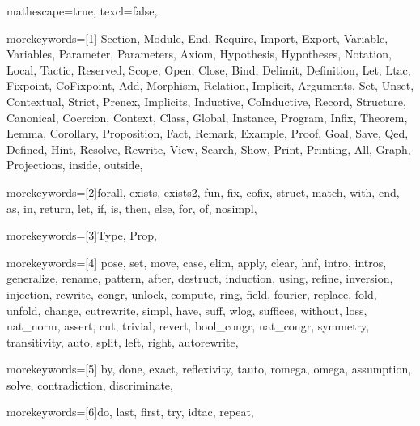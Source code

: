 
 {

mathescape=true,						
texcl=false,


morekeywords=[1]{
Section, Module, End, Require, Import, Export,
Variable, Variables, Parameter, Parameters, Axiom, Hypothesis, Hypotheses,
Notation, Local, Tactic, Reserved, Scope, Open, Close, Bind, Delimit,
Definition, Let, Ltac, Fixpoint, CoFixpoint, Add, Morphism, Relation,
Implicit, Arguments, Set, Unset, Contextual, Strict, Prenex, Implicits,
Inductive, CoInductive, Record, Structure, Canonical, Coercion,
Context, Class, Global, Instance, Program, Infix,
Theorem, Lemma, Corollary, Proposition, Fact, Remark, Example,
Proof, Goal, Save, Qed, Defined, Hint, Resolve, Rewrite, View,
Search, Show, Print, Printing, All, Graph, Projections, inside, outside},

morekeywords=[2]{forall, exists, exists2, fun, fix, cofix, struct,
      match, with, end, as, in, return, let, if, is, then, else,
      for, of, nosimpl},

morekeywords=[3]{Type, Prop},

morekeywords=[4]{
         pose, set, move, case, elim, apply, clear,
            hnf, intro, intros, generalize, rename, pattern, after,
	    destruct, induction, using, refine, inversion, injection,
         rewrite, congr, unlock, compute, ring, field, fourier, 
            replace, fold, unfold, change, cutrewrite, simpl,
         have, suff, wlog, suffices, without, loss, nat_norm,
            assert, cut, trivial, revert, bool_congr, nat_congr,
	 symmetry, transitivity, auto, split, left, right, autorewrite},        

morekeywords=[5]{
         by, done, exact, reflexivity, tauto, romega, omega,
         assumption, solve, contradiction, discriminate},


morekeywords=[6]{do, last, first, try, idtac, repeat},

}
